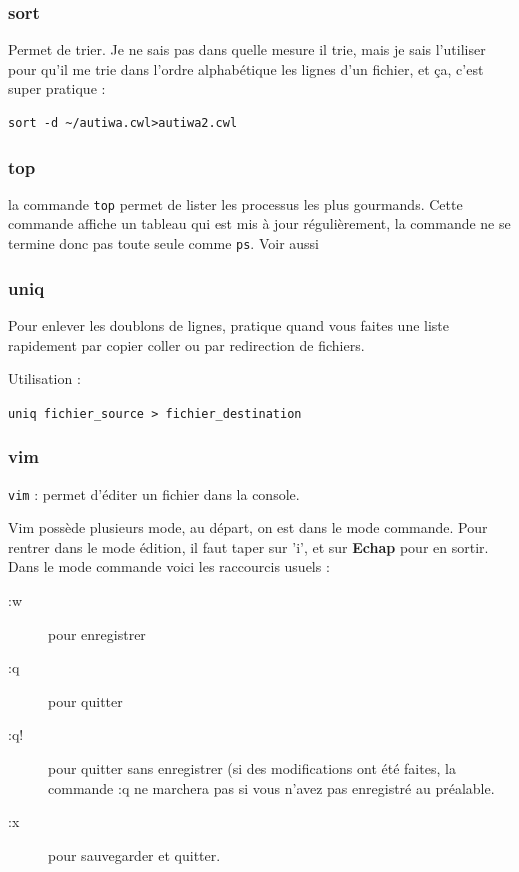 \documentclass[a4paper,twoside]{article}
\begin{document}
\subsubsection{sort}
Permet de trier. Je ne sais pas dans quelle mesure il trie, mais je sais l'utiliser pour qu'il me trie dans l'ordre alphabétique les lignes d'un fichier, et ça, c'est super pratique :

\begin{verbatim}
sort -d ~/autiwa.cwl>autiwa2.cwl
\end{verbatim}


\subsubsection{top}
la commande \verb|top| permet de lister les processus les plus gourmands. Cette commande affiche un tableau qui est mis à jour régulièrement, la commande ne se termine donc pas toute seule comme \verb|ps|. Voir aussi 

\subsubsection{uniq}
Pour enlever les doublons de lignes, pratique quand vous faites une liste rapidement par copier coller ou par redirection de fichiers.

Utilisation :

\verb|uniq fichier_source > fichier_destination|

\subsubsection{vim}
\verb|vim| : permet d'éditer un fichier dans la console.\par
Vim possède plusieurs mode, au départ, on est dans le mode commande. Pour rentrer dans le mode édition, il faut taper sur 'i', et sur \textbf{Echap} pour en sortir.
Dans le mode commande voici les raccourcis usuels :
\begin{description}
 \item[ :w] pour enregistrer
\item[ :q] pour quitter
\item[ :q!] pour quitter sans enregistrer (si des modifications ont été faites, la commande :q ne marchera pas si vous n'avez pas enregistré au préalable.
\item[ :x] pour sauvegarder et quitter.
\end{description}
\end{document}
